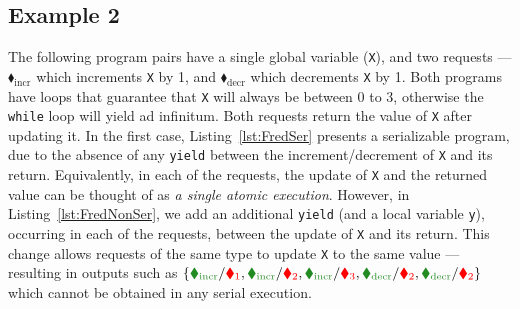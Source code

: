 \subsection{Example 2}

The following program pairs have a single global variable (\texttt{X}), and two requests --- {\color{ForestGreen}$\blacklozenge_\text{incr}$} which increments \texttt{X} by 1, and {\color{ForestGreen}$\blacklozenge_\text{decr}$} which decrements \texttt{X} by 1. Both programs have loops that guarantee that \texttt{X} will always be between 0 to 3, otherwise the \texttt{while} loop will yield ad infinitum. Both requests return the value of \texttt{X} after updating it.
%
In the first case, Listing~\ref{lst:FredSer} presents a serializable program, due to the absence of any \texttt{yield} between the increment/decrement of \texttt{X} and its return. Equivalently, in each of the requests, the update of \texttt{X} and the returned value can be thought of as \textit{a single atomic execution}.
%
However, in Listing~\ref{lst:FredNonSer}, we add an additional \texttt{yield} (and a local variable \texttt{y}), occurring in each of the requests, between the update of \texttt{X} and its return.
%
This change allows requests of the same type to update \texttt{X} to the same value ---  resulting in outputs such as
$\{{\color{ForestGreen}\blacklozenge_\text{incr}}/{\color{red}\blacklozenge_\text{1}},{\color{ForestGreen}\blacklozenge_\text{incr}}/{\color{red}\blacklozenge_\text{2}},{\color{ForestGreen}\blacklozenge_\text{incr}}/{\color{red}\blacklozenge_\text{3}},{\color{ForestGreen}\blacklozenge_\text{decr}}/{\color{red}\blacklozenge_\text{2}},{\color{ForestGreen}\blacklozenge_\text{decr}}/{\color{red}\blacklozenge_\text{2}}\}$ which cannot be obtained in any serial execution.

%
%
%


